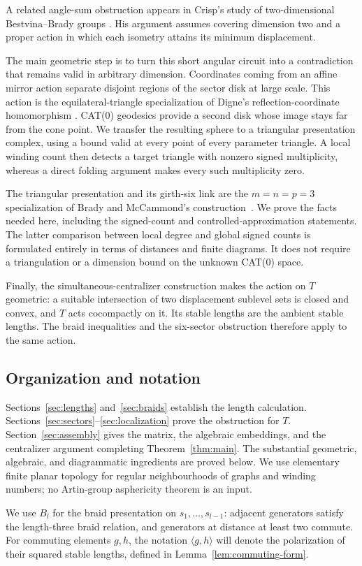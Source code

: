 A related angle-sum obstruction appears in Crisp's study of
two-dimensional Bestvina--Brady groups
\cite[Lemma~1.3 and the following remark]{Crisp2002}.
His argument assumes covering dimension two and a proper action in which
each isometry attains its minimum displacement.

The main geometric step is to turn this short angular circuit into a
contradiction that remains valid in arbitrary dimension.  Coordinates
coming from an affine mirror action separate disjoint regions of the
sector disk at large scale.  This action is the equilateral-triangle
specialization of Digne's reflection-coordinate homomorphism
\cite[Proposition~2.1]{Digne2016}.  CAT(0) geodesics provide a second
disk whose image stays far from the cone point.  We transfer the resulting sphere
to a triangular presentation complex, using a bound valid at every
point of every parameter triangle.  A local winding count then detects
a target triangle with nonzero signed multiplicity, whereas a direct
folding argument makes every such multiplicity zero.

The triangular presentation and its girth-six link are the
\(m=n=p=3\) specialization of Brady and McCammond's
construction~\cite[preprint Lemmas~2--3]{BradyMcCammond2000}.
We prove the facts needed here,
including the signed-count and controlled-approximation statements.
The latter comparison between local degree and global signed counts
is formulated entirely in terms of distances and finite diagrams.
It does not require a triangulation or a dimension bound on the unknown
CAT(0) space.

Finally, the simultaneous-centralizer construction makes the action on
\(T\) geometric: a suitable intersection of two displacement sublevel
sets is closed and convex, and \(T\) acts cocompactly on it.  Its stable
lengths are the ambient stable lengths.  The braid inequalities and the
six-sector obstruction therefore apply to the same action.

\subsection*{Organization and notation}

Sections~\ref{sec:lengths} and~\ref{sec:braids} establish the length
calculation.  Sections~\ref{sec:sectors}--\ref{sec:localization} prove the
obstruction for \(T\).  Section~\ref{sec:assembly} gives the matrix,
the algebraic embeddings, and the centralizer argument completing
Theorem~\ref{thm:main}.  The substantial geometric, algebraic, and
diagrammatic ingredients are proved below.  We use elementary finite planar topology for regular
neighbourhoods of graphs and winding numbers; no Artin-group asphericity
theorem is an input.

We use \(B_l\) for the braid presentation on
\(s_1,\ldots,s_{l-1}\): adjacent generators satisfy the length-three
braid relation, and generators at distance at least two commute.
For commuting elements \(g,h\), the notation \(\langle g,h\rangle\)
will denote the polarization of their squared stable lengths, defined
in Lemma~\ref{lem:commuting-form}.
